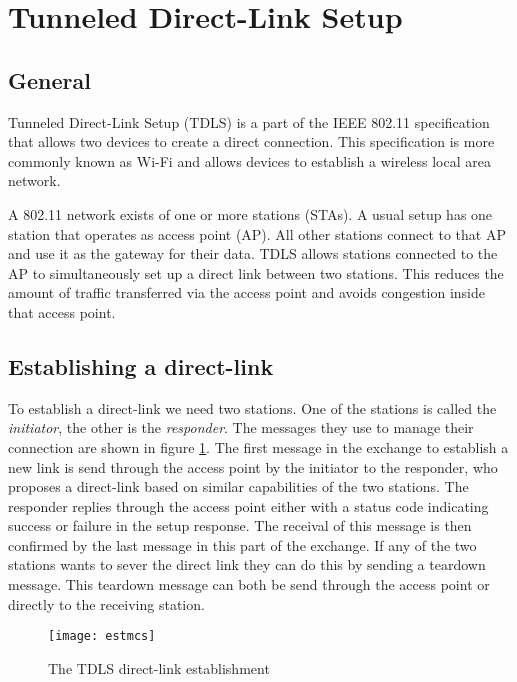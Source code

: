 \section{Tunneled Direct-Link Setup}\label{tdls}

\iffalse
- TDLS
	- 802.11
	- PeerKey
\fi

\subsection{General}

Tunneled Direct-Link Setup (TDLS) is a part of the IEEE 802.11 specification\cite{80211} that allows two devices to create a direct connection. This specification is more commonly known as Wi-Fi and allows devices to establish a wireless local area network.

A 802.11 network exists of one or more stations (STAs). A usual setup has one station that operates as access point (AP). All other stations connect to that AP and use it as the gateway for their data. TDLS allows stations connected to the AP to simultaneously set up a direct link between two stations. This reduces the amount of traffic transferred via the access point and avoids congestion inside that access point.

\subsection{Establishing a direct-link}
\label{sec:establishing-tdls}

To establish a direct-link we need two stations. One of the stations is called the \emph{initiator}, the other is the \emph{responder}. The messages they use to manage their connection are shown in figure \ref{fig:establishment-mcs}. The first message in the exchange to establish a new link is send through the access point by the initiator to the responder, who proposes a direct-link based on similar capabilities of the two stations. The responder replies through the access point either with a status code indicating success or failure in the setup response. The receival of this message is then confirmed by the last message in this part of the exchange. If any of the two stations wants to sever the direct link they can do this by sending a teardown message. This teardown message can both be send through the access point or directly to the receiving station.

\begin{figure}[!h]
	\centering
	\texttt{[image: estmcs]}
	\caption{The TDLS direct-link establishment}
	\label{fig:establishment-mcs}
\end{figure}

